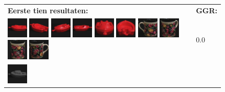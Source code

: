 {\begin{figure}[p]
\vspace{5pt}
\centering
\begin{tabular}{m{11cm} | m{3cm} |}
\textbf{Eerste tien resultaten:} & \textbf{GGR:} \\
\vspace{4pt}
\includegraphics[width=1cm]{coil/beeld-18.eps}
\includegraphics[width=1cm]{coil/beeld-22.eps}
\includegraphics[width=1cm]{coil/beeld-21.eps}
\includegraphics[width=1cm]{coil/beeld-19.eps}
\includegraphics[width=1cm]{coil/beeld-20.eps}
\includegraphics[width=1cm]{coil/beeld-23.eps}
\includegraphics[width=1cm]{coil/beeld-61.eps}
\includegraphics[width=1cm]{coil/beeld-63.eps}
\includegraphics[width=1cm]{coil/beeld-62.eps}
\includegraphics[width=1cm]{coil/beeld-60.eps}
& {\scriptsize 0.0}
\\
\includegraphics[width=1cm]{coil/beeld-24.eps}

\end{tabular}
\end{figure}}
